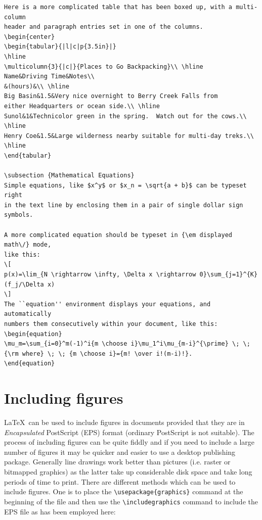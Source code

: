 \documentclass[11pt,oneside]{book}
\begin{document}
\begin{verbatim}
Here is a more complicated table that has been boxed up, with a multi-column
header and paragraph entries set in one of the columns.
\begin{center}
\begin{tabular}{|l|c|p{3.5in}|}
\hline
\multicolumn{3}{|c|}{Places to Go Backpacking}\\ \hline
Name&Driving Time&Notes\\
&(hours)&\\ \hline
Big Basin&1.5&Very nice overnight to Berry Creek Falls from
either Headquarters or ocean side.\\ \hline
Sunol&1&Technicolor green in the spring.  Watch out for the cows.\\ \hline
Henry Coe&1.5&Large wilderness nearby suitable for multi-day treks.\\ \hline
\end{tabular}

\subsection {Mathematical Equations}
Simple equations, like $x^y$ or $x_n = \sqrt{a + b}$ can be typeset right
in the text line by enclosing them in a pair of single dollar sign symbols.

A more complicated equation should be typeset in {\em displayed math\/} mode,
like this:
\[
p(x)=\lim_{N \rightarrow \infty, \Delta x \rightarrow 0}\sum_{j=1}^{K}(f_j/\Delta x)
\]
The ``equation'' environment displays your equations, and automatically
numbers them consecutively within your document, like this:
\begin{equation}
\mu_m=\sum_{i=0}^m(-1)^i{m \choose i}\mu_1^i\mu_{m-i}^{\prime} \; \; {\rm where} \; \; {m \choose i}={m! \over i!(m-i)!}.
\end{equation}

\end{verbatim}
\section{Including figures}
\LaTeX \ can be used to include figures in documents provided that
they are in {\em Encapsulated} PostScript (EPS) format (ordinary PostScript
is not suitable). The process of including figures can be quite
fiddly and if you need to include a large number of figures it
may be quicker and easier to use a desktop publishing package.
Generally line drawings work better than pictures (i.e. raster
or bitmapped graphics) as the latter take up considerable disk space
and take long periods of time to print. There are different methods
which can be used to include figures. One is to place the 
\verb+\usepackage{graphics}+ command at the beginning of the file
and then use the 
\verb+\includegraphics+ command to include
the EPS file as has been employed here:
\end{document}
